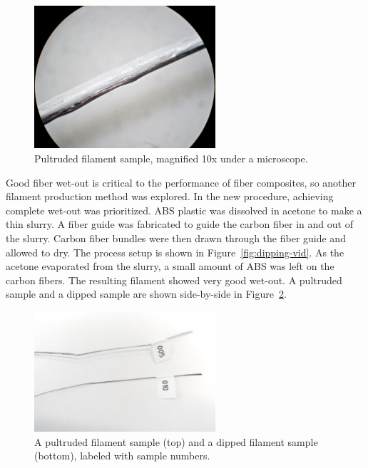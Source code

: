 \begin{figure}[htp]
    \centering
    \includegraphics[width=0.6\textwidth]{./figures/pultruded-scope}
    \caption{Pultruded filament sample, magnified 10x under a microscope.}
    \label{fig:pultruded-scope}
\end{figure}

Good fiber wet-out is critical to the performance of fiber composites, so another filament production method was explored. In the new procedure, achieving complete wet-out was prioritized. ABS plastic was dissolved in acetone to make a thin slurry. A fiber guide was fabricated to guide the carbon fiber in and out of the slurry. Carbon fiber bundles were then drawn through the fiber guide and allowed to dry. The process setup is shown in Figure~\ref{fig:dipping-vid}. As the acetone evaporated from the slurry, a small amount of ABS was left on the carbon fibers. The resulting filament showed very good wet-out. A pultruded sample and a dipped sample are shown side-by-side in Figure~\ref{fig:two-samples}.

\begin{figure}[htp]
    \centering
    \includegraphics[width=0.6\textwidth]{./figures/FilamentSample}
    \caption{A pultruded filament sample (top) and a dipped filament sample (bottom), labeled with sample numbers.}
    \label{fig:two-samples}
\end{figure}

